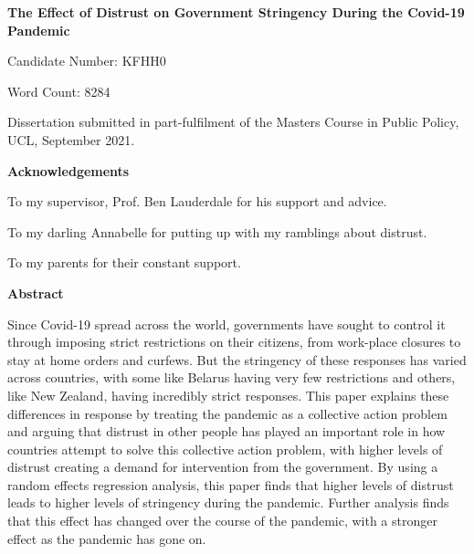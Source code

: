 \documentclass[
  11pt,
]{article}
\author{}
\date{\vspace{-2.5em}}
\begin{document}
\begin{titlepage}
\begin{center}
\vspace*{5cm}
\LARGE
\textbf{The Effect of Distrust on Government Stringency During the Covid-19 Pandemic}


\vspace{1.5cm}
\large
Candidate Number: KFHH0

\vspace{0.5cm}
Word Count: 8284

\vfill

Dissertation submitted in part-fulfilment of the Masters Course in Public Policy, UCL,  September 2021.

\end{center}
\end{titlepage}

\begin{center}
\textbf{Acknowledgements}

To my supervisor, Prof. Ben Lauderdale for his support and advice.

To my darling Annabelle for putting up with my ramblings about distrust.

To my parents for their constant support.
\end{center}

\pagebreak

\begin{center}
\vspace*{5cm}
\textbf{Abstract}
\end{center}
Since Covid-19 spread across the world, governments have sought to control it through imposing strict restrictions on their citizens, from work-place closures to stay at home orders and curfews. But the stringency of these responses has varied across countries, with some like Belarus having very few restrictions and others, like New Zealand, having incredibly strict responses. This paper explains these differences in response by treating the pandemic as a collective action problem and arguing that distrust in other people has played an important role in how countries attempt to solve this collective action problem, with higher levels of distrust creating a demand for intervention from the government. By using a random effects regression analysis, this paper finds that higher levels of distrust leads to higher levels of stringency during the pandemic. Further analysis finds that this effect has changed over the course of the pandemic, with a stronger effect as the pandemic has gone on.
\pagebreak
\end{document}
